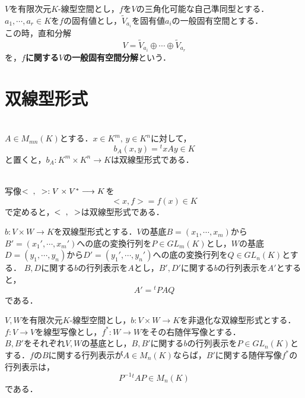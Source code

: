 \documentclass[uplatex, 12pt, dvipdfmx]{jsreport}
\begin{document}
\begin{definition}
    $V$を有限次元$K$-線型空間とし，$f$を$V$の三角化可能な自己準同型とする．$a_1,\cdots,a_r\in K$を$f$の固有値とし，$\widetilde{V}_{a_i}$を固有値$a_i$の一般固有空間とする．\\ この時，直和分解
    $$V=\widetilde{V}_{a_i}\oplus\cdots\oplus\widetilde{V}_{a_r}$$
    を，\textbf{$f$に関する$V$の一般固有空間分解}という．
\end{definition}

\clearpage

\chapter{双線型形式}

\begin{definition}[行列Aが定める双線型形式]　\\
    $A\in M_{mn}(K)$とする．$x\in K^m,\,y\in K^n$に対して，$$b_A(x,y)={}^txAy\in K$$と置くと，$b_A:K^m\times K^n\longrightarrow K$は双線型形式である．
\end{definition}
\begin{definition}[標準双線型形式]　\\
    写像$<\hspace{2mm},\hspace{2mm}>:V\times V^*\longrightarrow K$を$$<x,f>=f(x)\in K$$で定めると，$<\hspace{2mm},\hspace{2mm}>$は双線型形式である．
\end{definition}

\begin{proposition}
    $b:V\times W\longrightarrow K$を双線型形式とする．$V$の基底$B=(x_1,\cdots,x_m)$から$B'=(x_1',\cdots,x_m')$への底の変換行列を$P\in GL_m(K)$とし，$W$の基底$D=(y_1,\cdots,y_n)$から$D'=(y_1',\cdots,y_n')$への底の変換行列を$Q\in GL_n(K)$とする．
    $B,D$に関する$b$の行列表示を$A$とし，$B',D'$に関する$b$の行列表示を$A'$とすると，$$A'={}^tPAQ$$である．
\end{proposition}

\begin{proposition}[転置と随伴関手]
    $V,W$を有限次元$K$-線型空間とし，$b:V\times W\longrightarrow K$を非退化な双線型形式とする．$f:V\longrightarrow V$を線型写像とし，$f^*:W\longrightarrow W$をその右随伴写像とする．\\
    $B,B'$をそれぞれ$V,W$の基底とし，$B,B'$に関する$b$の行列表示を$P\in GL_n(K)$とする．$f$の$B$に関する行列表示が$A\in M_n(K)$ならば，$B'$に関する随伴写像$f^*$の行列表示は，
    $$P^{-1}{}^tAP\in M_n(K)$$
    である．
\end{proposition}
\end{document}
